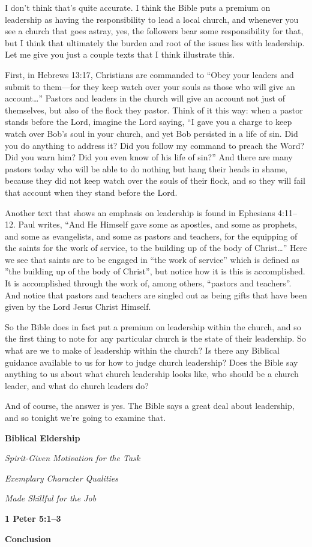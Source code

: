 \documentclass[letterpaper, 12pt]{article}
\begin{document}
    I don't think that's quite accurate. I think the Bible puts a
    premium on leadership as having the responsibility to lead a local
    church, and whenever you see a church that goes astray, yes, the
    followers bear some responsibility for that, but I think that
    ultimately the burden and root of the issues lies with leadership.
    Let me give you just a couple texts that I think illustrate this.
    
    First, in Hebrews 13:17, Christians are commanded to ``Obey your
    leaders and submit to them---for they keep watch over your souls as
    those who will give an account\ldots'' Pastors and leaders in the
    church will give an account not just of themselves, but also of the
    flock they pastor. Think of it this way: when a pastor stands before
    the Lord, imagine the Lord saying, ``I gave you a charge to keep
    watch over Bob's soul in your church, and yet Bob persisted in a
    life of sin. Did you do anything to address it? Did you follow my
    command to preach the Word? Did you warn him?  Did you even know of
    his life of sin?'' And there are many pastors today who will be able
    to do nothing but hang their heads in shame, because they did not
    keep watch over the souls of their flock, and so they will fail that
    account when they stand before the Lord.

    Another text that shows an emphasis on leadership is found in
    Ephesians 4:11--12. Paul writes, ``And He Himself gave some as
    apostles, and some as prophets, and some as evangelists, and some as
    pastors and teachers, for the equipping of the saints for the work
    of service, to the building up of the body of Christ\ldots'' Here we
    see that saints are to be engaged in ``the work of service'' which
    is defined as ''the building up of the body of Christ'', but notice
    how it is this is accomplished. It is accomplished through the work
    of, among others, ``pastors and teachers''. And notice that pastors
    and teachers are singled out as being gifts that have been given by
    the Lord Jesus Christ Himself.

    So the Bible does in fact put a premium on leadership within the
    church, and so the first thing to note for any particular church is
    the state of their leadership. So what are we to make of leadership
    within the church? Is there any Biblical guidance available to us
    for how to judge church leadership? Does the Bible say anything to
    us about what church leadership looks like, who should be a church
    leader, and what do church leaders do? 

    And of course, the answer is yes. The Bible says a great deal about
    leadership, and so tonight we're going to examine that.

    \noindent \textbf{Biblical Eldership}

    \noindent \emph{Spirit-Given Motivation for the Task}

    \noindent \emph{Exemplary Character Qualities}

    \noindent \emph{Made Skillful for the Job}

    \noindent \textbf{1 Peter 5:1--3}

    \noindent \textbf{Conclusion}
\end{document}
